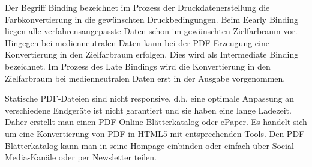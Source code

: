 Der Begriff Binding bezeichnet im Prozess der Druckdatenerstellung die Farbkonvertierung in die gewünschten Druckbedingungen. Beim Eearly Binding liegen alle verfahrensangepasste Daten schon im gewünschten Zielfarbraum vor. Hingegen bei medienneutralen Daten kann bei der PDF-Erzeugung eine Konvertierung in den Zielfarbraum erfolgen. Dies wird als Intermediate Binding bezeichnet. Im Prozess des Late Bindings wird die Konvertierung in den Zielfarbraum bei medienneutralen Daten erst in der Ausgabe vorgenommen. 
\cite{schneeberger}

Statische PDF-Dateien sind nicht responsive, d.h. eine optimale Anpassung an verschiedene Endgeräte ist nicht garantiert und sie haben eine lange Ladezeit. Daher erstellt man einen PDF-Online-Blätterkatalog oder ePaper. Es handelt sich um eine Konvertierung von PDF in HTML5 mit entsprechenden Tools. Den PDF-Blätterkatalog kann man in seine Hompage einbinden oder einfach über Social-Media-Kanäle oder per Newsletter teilen.
\cite{mypdf-blaetterk}
